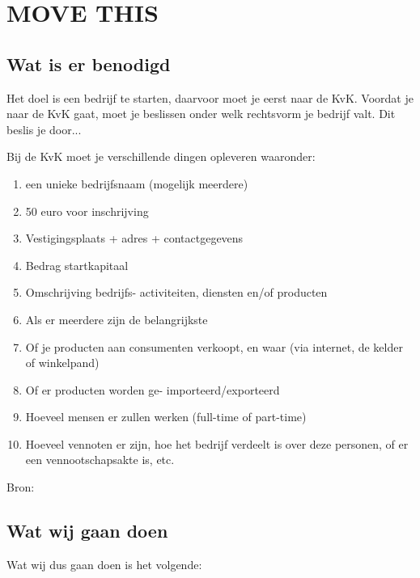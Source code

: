 \documentclass[11pt,oneside,a4paper,numbers=enddot]{report} %
\begin{document}
\Pre









\chapter{MOVE THIS}
\section{Wat is er benodigd}

Het doel is een bedrijf te starten, daarvoor moet je eerst naar de KvK.
Voordat je naar de KvK gaat, moet je beslissen onder welk rechtsvorm je bedrijf valt.
Dit beslis je door... 

Bij de KvK moet je verschillende dingen opleveren waaronder:

\begin{enumerate}

\item
  een unieke bedrijfsnaam (mogelijk meerdere)
\item
  50 euro voor inschrijving
\item
  Vestigingsplaats
  + adres
  + contactgegevens
\item
  Bedrag startkapitaal
\item
  Omschrijving bedrijfs- activiteiten,
  diensten en/of
  producten
\item
  Als er meerdere zijn de belangrijkste
\item
  Of je producten aan consumenten verkoopt,
  en waar
  (via internet,
  de kelder of winkelpand)
\item
  Of er producten worden ge- importeerd/exporteerd
\item
  Hoeveel mensen er zullen werken
  (full-time of part-time)
\item
  Hoeveel vennoten er zijn,
  hoe het bedrijf verdeelt is over deze personen,
  of er een vennootschapsakte is,
  etc.
  
\end{enumerate}

Bron: \cite{kvk}

\section{Wat wij gaan doen}

Wat wij dus gaan doen is het volgende:
\end{document}
